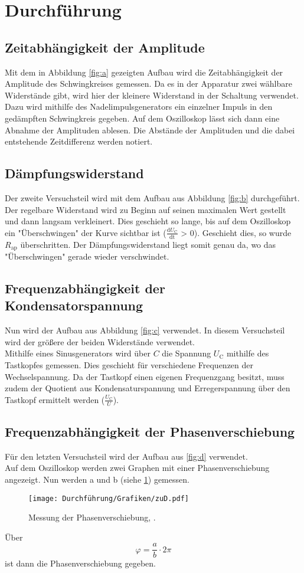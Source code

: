 \section{Durchführung}
\subsection{Zeitabhängigkeit der Amplitude}
Mit dem in Abbildung \ref{fig:a} gezeigten Aufbau wird die Zeitabhängigkeit der Amplitude des Schwingkreises gemessen. Da es in der Apparatur zwei wählbare Widerstände gibt, wird hier der kleinere Widerstand in der Schaltung verwendet. 
\\
Dazu wird mithilfe des Nadelimpulsgenerators ein einzelner Impuls in den gedämpften Schwingkreis gegeben. Auf dem Oszilloskop lässt sich dann eine Abnahme der Amplituden ablesen. Die Abstände der Amplituden und die dabei entstehende Zeitdifferenz werden notiert. 

\subsection{Dämpfungswiderstand}
Der zweite Versuchsteil wird mit dem Aufbau aus Abbildung \ref{fig:b} durchgeführt. Der regelbare Widerstand wird zu Beginn auf seinen maximalen Wert gestellt und dann langsam verkleinert. Dies geschieht so lange, bis auf dem Oszilloskop ein "Überschwingen" der Kurve sichtbar ist ($\frac{\text{d}U_\text{C}}{\text{dt}}$ > 0). Geschieht dies, so wurde $R_\text{ap}$ überschritten. 
Der Dämpfungswiderstand liegt somit genau da, wo das "Überschwingen" gerade wieder verschwindet.

\subsection{Frequenzabhängigkeit der Kondensatorspannung}
Nun wird der Aufbau aus Abbildung \ref{fig:c} verwendet. In diesem Versuchsteil wird der größere der beiden Widerstände verwendet.
\\
Mithilfe eines Sinusgenerators wird über $C$ die Spannung $U_\text{C}$ mithilfe des Tastkopfes gemessen. Dies geschieht für verschiedene Frequenzen der Wechselspannung. 
Da der Tastkopf einen eigenen Frequenzgang besitzt, muss zudem der Quotient aus Kondensaturspannung und Erregerspannung über den Tastkopf ermittelt werden ($\frac{U_\text{C}}{U}$).

\subsection{Frequenzabhängigkeit der Phasenverschiebung}
Für den letzten Versuchsteil wird der Aufbau aus \ref{fig:d} verwendet. 
\\
Auf dem Oszilloskop werden zwei Graphen mit einer Phasenverschiebung angezeigt.
Nun werden a und b (siehe \ref{fig:zuD}) gemessen.
\begin{figure}[H]
  \centering
  \texttt{[image: Durchführung/Grafiken/zuD.pdf]}
  \caption{Messung der Phasenverschiebung, \cite{1}.}
  \label{fig:zuD}
\end{figure}
Über 
\begin{equation}
\varphi = \frac{a}{b} \cdot 2\pi
\end{equation}
ist dann die Phasenverschiebung gegeben.